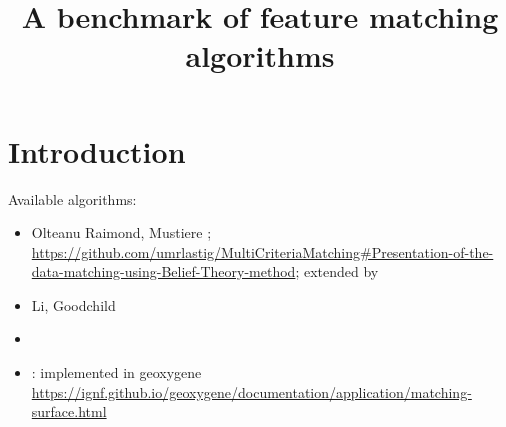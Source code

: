 \documentclass{article}
\title{A benchmark of feature matching algorithms}
\author{}
\date{}
\begin{document}
\maketitle

\section{Introduction}


Available algorithms:
\begin{itemize}
    \item Olteanu Raimond, Mustiere \cite{olteanu2008data}; \url{https://github.com/umrlastig/MultiCriteriaMatching#Presentation-of-the-data-matching-using-Belief-Theory-method}; extended by \cite{maidaneh2022evaluation}
    \item Li, Goodchild \cite{li2011optimisation}
    \item \cite{gombosi2003comparing}
    \item \cite{ali2001qualite}: implemented in geoxygene \url{https://ignf.github.io/geoxygene/documentation/application/matching-surface.html}
\end{itemize}







\end{document}
